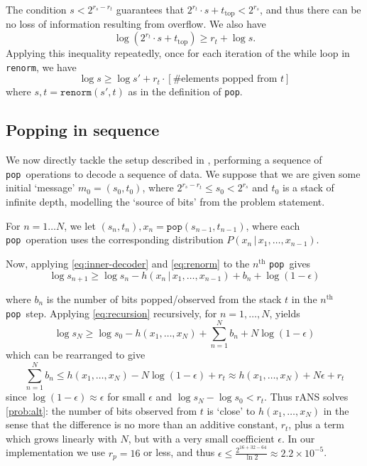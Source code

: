 \documentclass{article}
\newcommand\given{\,\vert\,}
\newcommand{\pop}{\texttt{pop}}
\begin{document}
The condition $s < 2^{r_s - r_t}$ guarantees that $2^{r_t} \cdot s +
t_{\text{top}} < 2^{r_s}$, and thus there can be no loss of information
resulting from overflow. We also have
\begin{equation}
  \log (2^{r_t} \cdot s + t_\text{top}) \geq r_t + \log s.
\end{equation}
Applying this inequality repeatedly, once for each iteration of the while loop
in \texttt{renorm}, we have
\begin{equation}\label{eq:renorm}
\log s \geq \log s' + r_t\cdot\left[\text{\# elements popped from $t$}\right]
\end{equation}
where $s, t = \texttt{renorm}(s', t)$ as in the definition of \pop.

\subsection{Popping in sequence}
We now directly tackle the setup described in , performing a
sequence of \pop\ operations to decode a sequence of data. We suppose that we
are given some initial `message' $m_0= (s_0, t_0)$, where $2^{r_s - r_t} \leq
s_0 < 2^{r_s}$ and $t_0$ is a stack of infinite depth, modelling the `source of
bits' from the problem statement.

For $n=1\ldots N$, we let $(s_n, t_n), x_n = \pop(s_{n-1}, t_{n-1})$, where
each \pop\ operation uses the corresponding distribution $P(x_n\given
x_1,\ldots,x_{n-1})$.

Now, applying \cref{eq:inner-decoder} and \cref{eq:renorm} to the
$n^\mathrm{th}$ \pop\ gives
\begin{equation}\label{eq:recursion}
  \log s_{n+1} \geq \log s_n - h(x_n\given x_1,\ldots,x_{n-1}) + b_n + \log (1
  - \epsilon)
\end{equation}

where $b_n$ is the number of bits popped/observed from the stack $t$ in the
$n^{\mathrm{th}}$ \pop\ step. Applying \cref{eq:recursion} recursively, for
$n=1,\ldots, N$, yields
\begin{equation}
  \log s_N \geq \log s_0 - h(x_1, \ldots, x_N) + \sum_{n=1}^{N} b_n +
  N\log(1-\epsilon)
\end{equation}
which can be rearranged to give
\begin{equation}
  \sum_{n=1}^Nb_n \leq h(x_1, \ldots, x_N) - N\log(1-\epsilon) + r_t
  \approx h(x_1, \ldots, x_N) + N\epsilon + r_t
\end{equation}
since $\log(1 - \epsilon)\approx\epsilon$ for small $\epsilon$ and $\log s_N -
\log s_0 < r_t$. Thus rANS solves \cref{prob:alt}: the number of bits observed
from $t$ is `close' to $h(x_1,\ldots,x_N)$ in the sense that the difference is
no more than an additive constant, $r_t$, plus a term which grows linearly with
$N$, but with a very small coefficient $\epsilon$. In our implementation we use
$r_p = 16$ or less, and thus $\epsilon \leq \frac{2^{16 + 32 - 64}}{\ln 2}
\approx 2.2\times 10^{-5}$.
\end{document}
